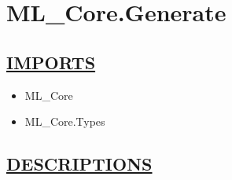 \chapter*{ML\_Core.Generate}
\hypertarget{ecldoc:toc:ML_Core.Generate}{}

\section*{\underline{IMPORTS}}
\begin{itemize}
\item ML\_Core
\item ML\_Core.Types
\end{itemize}

\section*{\underline{DESCRIPTIONS}}
